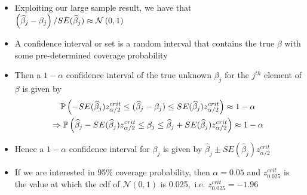 \documentclass[notes=show]{beamer}
\begin{document}
\begin{frame}%


\begin{itemize}
\item Exploiting our large sample result, we have that $\left( \widehat{%
\beta }_{j}-\beta _{j}\right) /SE(\widehat{\beta }_{j})\approx \mathcal{N}%
\left( 0,1\right) $

\item A confidence interval or set is a random interval that contains the
true $\beta $ with some pre-determined coverage probability

\item Then a $1-\alpha $ confidence interval of the true unknown $\beta _{j}$
for the $j^{th}$ element of $\beta $ is given by%
\begin{gather*}
\mathbb{P}\left( -SE(\widehat{\beta }_{j})z_{\alpha /2}^{crit}\leq (\widehat{%
\beta }_{j}-\beta _{j})\leq SE(\widehat{\beta }_{j})z_{\alpha
/2}^{crit}\right) \approx 1-\alpha \\
\Rightarrow \mathbb{P}\left( \widehat{\beta }_{j}-SE(\widehat{\beta }%
_{j})z_{\alpha /2}^{crit}\leq \beta _{j}\leq \widehat{\beta }_{j}+SE(%
\widehat{\beta }_{j})z_{\alpha /2}^{crit}\right) \approx 1-\alpha
\end{gather*}

\item Hence a $1-\alpha $ confidence interval for $\beta _{j}$ is given by $%
\widehat{\beta }_{j}\pm SE(\widehat{\beta }_{j})z_{\alpha /2}^{crit}$

\item If we are interested in 95\% coverage probability, then $\alpha =0.05$
and $z_{0.025}^{crit}$ is the value at which the cdf of $\mathcal{N}\left(
0,1\right) $ is 0.025$,$ i.e. $z_{0.025}^{crit}=-1.96$
\end{itemize}

\end{frame}%
\end{document}
